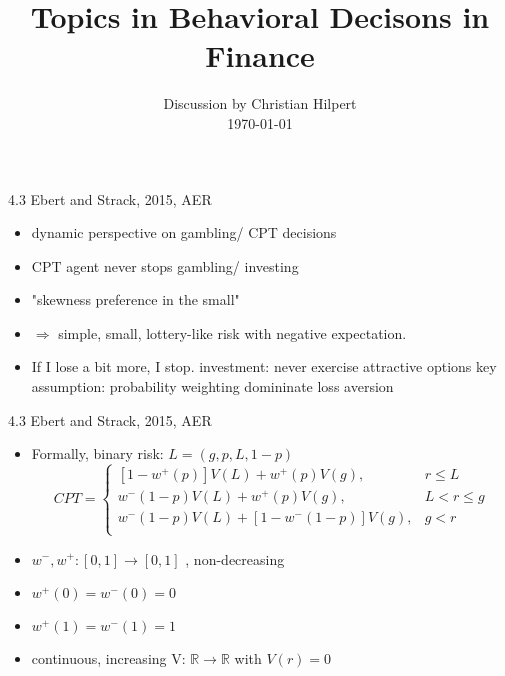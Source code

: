 \documentclass[11pt,aspectratio=169]{beamer}
\begin{document}

\title{Topics in Behavioral Decisons in Finance}
\date{Discussion by Christian Hilpert\\ \today}
\begin{frame}
    \titlepage
\end{frame}


\begin{frame}{4.3 Ebert and Strack, 2015, AER}
    \begin{itemize}
        \item dynamic perspective on gambling/ CPT decisions\medskip
        \item CPT agent never stops gambling/ investing\medskip
        \item "skewness preference in the small"\medskip
        \item $\Rightarrow$ simple, small, lottery-like risk with negative expectation.\medskip
        \item If I lose a bit more, I stop.\medskip
        \quad investment: never exercise attractive  options\medskip
        \quad key assumption: probability weighting domininate loss aversion\medskip
	\end{itemize}
\end{frame}



\begin{frame}{4.3 Ebert and Strack, 2015, AER}
    \begin{itemize}
        \item  Formally, binary risk:  $ L=(g,p,L,1-p) $\medskip
    \begin{equation}
        CPT = \begin{cases}
        [1-w^+(p)]V(L)+w^+(p)V(g),  & r \leq  L\\
        w^-(1-p)V(L)+w^+(p)V(g) ,  & L< r \leq g \\
        w^-(1-p)V(L)+[1-w^-(1-p)]V(g),  & g< r\\
        \end{cases}
    \end{equation}\medskip

    \item $w^-,w^+:[0,1] \rightarrow [0,1]$  , non-decreasing\medskip
    \item $w^+(0)=w^-(0)=0$\medskip
    \item $w^+(1)=w^-(1)=1$\medskip
    \item continuous, increasing V: $\mathbb{R} \rightarrow \mathbb{R} $ with $V(r)=0$\medskip
\end{itemize} 
\end{frame}
\end{document}
